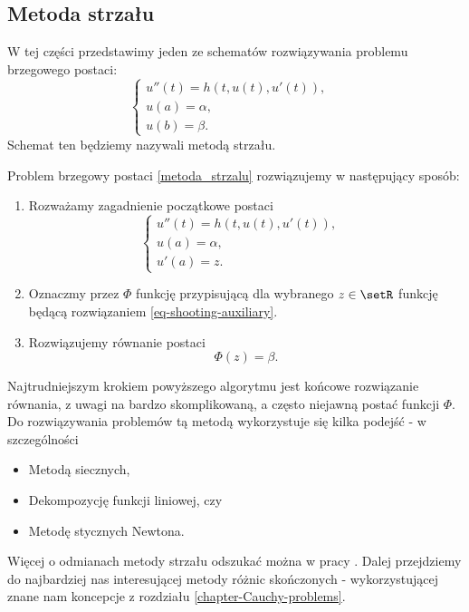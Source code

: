 \subsection{Metoda strzału}
W tej części przedstawimy jeden ze schematów rozwiązywania problemu brzegowego postaci:
\begin{equation}\label{metoda_strzalu}
\left\{\begin{array}{ll}
u''(t)=h(t,u(t),u'(t)), & \\
u(a)= \alpha, & \\
u(b)= \beta.
\end{array}\right.
\end{equation}
Schemat ten będziemy nazywali metodą strzału. 
\begin{algorithm}
Problem brzegowy postaci \eqref{metoda_strzalu} rozwiązujemy w następujący sposób:
\begin{enumerate}
\item Rozważamy zagadnienie początkowe postaci
\begin{equation} \label{eq-shooting-auxiliary}
\left\{\begin{array}{ll}
u''(t)=h(t,u(t),u'(t)), & \\
u(a)= \alpha, & \\
u'(a)= z.
\end{array}\right.
\end{equation}
\item Oznaczmy przez $\Phi$ funkcję przypisującą dla wybranego $z \in \setR$ funkcję będącą rozwiązaniem \eqref{eq-shooting-auxiliary}.
\item Rozwiązujemy równanie postaci 
$$
\Phi(z) = \beta.
$$ 
\end{enumerate}
Najtrudniejszym krokiem powyższego algorytmu jest końcowe rozwiązanie równania, z uwagi na bardzo skomplikowaną, a często niejawną postać funkcji $\Phi$. Do rozwiązywania problemów tą metodą wykorzystuje się kilka podejść - w szczególności
\begin{itemize}
\item Metodą siecznych,
\item Dekompozycję funkcji liniowej, czy
\item Metodę stycznych Newtona.
\end{itemize}
\end{algorithm}
Więcej o odmianach metody strzału odszukać można w pracy \citep{kincaid1991numerical}. Dalej przejdziemy do najbardziej nas interesującej metody różnic skończonych - wykorzystującej znane nam koncepcje z rozdziału \ref{chapter-Cauchy-problems}.

